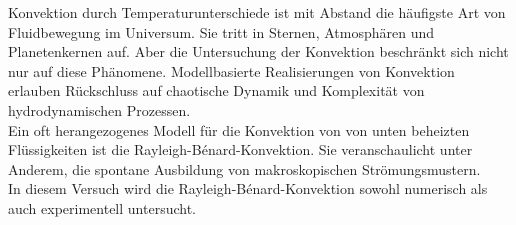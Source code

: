 Konvektion durch Temperaturunterschiede ist mit Abstand die häufigste Art von Fluidbewegung im Universum. Sie tritt in Sternen, Atmosphären und Planetenkernen auf.
Aber die Untersuchung der Konvektion beschränkt sich nicht nur auf diese Phänomene. Modellbasierte Realisierungen von Konvektion erlauben Rückschluss auf chaotische Dynamik und Komplexität von hydrodynamischen Prozessen.
\\
Ein oft herangezogenes Modell für die Konvektion von von unten beheizten Flüssigkeiten ist die Rayleigh-B\'enard-Konvektion. Sie veranschaulicht unter Anderem, die spontane Ausbildung von makroskopischen Strömungsmustern.
\\
In diesem Versuch wird die Rayleigh-B\'enard-Konvektion sowohl numerisch als auch experimentell untersucht. 

